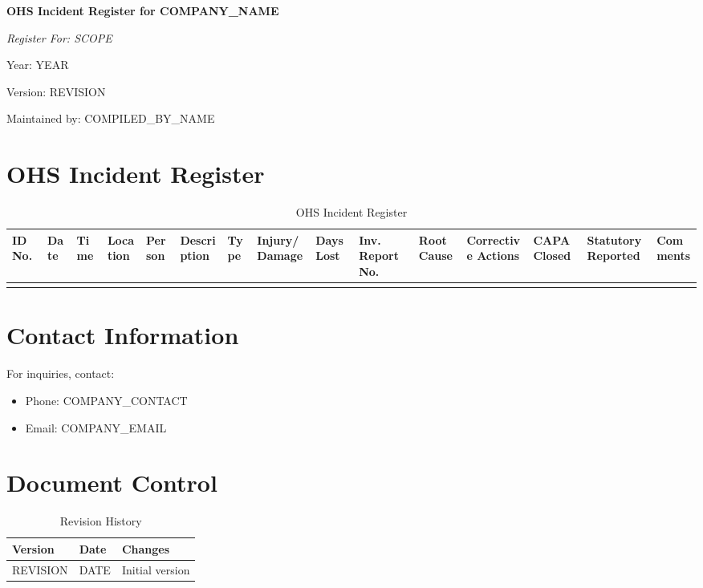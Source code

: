 \documentclass[12pt]{article}
\begin{document}
\begin{titlepage}
    \centering
    \vspace*{2cm}
    {\LARGE\bfseries OHS Incident Register for {{COMPANY_NAME}}\par}
    \vspace{1cm}
    {\large\itshape Register For: {{SCOPE}}\par}
    \vspace{0.5cm}
    {\normalsize Year: {{YEAR}}\par}
    \vspace{0.5cm}
    {\normalsize Version: {{REVISION}}\par}
    \vspace{0.5cm}
    {\normalsize Maintained by: {{COMPILED_BY_NAME}}\par}
\end{titlepage}

\section{OHS Incident Register}

\begin{table}[h]
    \centering
    \begin{tabular}{p{1cm}p{2cm}p{2cm}p{2cm}p{2cm}p{3cm}p{2cm}p{2cm}p{2cm}p{2cm}p{2cm}p{2cm}p{2cm}p{2cm}}
        \toprule
        \textbf{ID No.} & \textbf{Date} & \textbf{Time} & \textbf{Location} & \textbf{Person} & \textbf{Description} & \textbf{Type} & \textbf{Injury/Damage} & \textbf{Days Lost} & \textbf{Inv. Report No.} & \textbf{Root Cause} & \textbf{Corrective Actions} & \textbf{CAPA Closed} & \textbf{Statutory Reported} & \textbf{Comments} \\
        \midrule
        & & & & & & & & & & & & & & \\
        \bottomrule
    \end{tabular}
    \caption{OHS Incident Register}
\end{table}

\section{Contact Information}
For inquiries, contact:
\begin{itemize}
    \item Phone: {{COMPANY_CONTACT}}
    \item Email: {{COMPANY_EMAIL}}
\end{itemize}

\section{Document Control}
\begin{table}[h]
    \centering
    \begin{tabular}{p{3cm}p{3cm}p{6cm}}
        \toprule
        \textbf{Version} & \textbf{Date} & \textbf{Changes} \\
        \midrule
        {{REVISION}} & {{DATE}} & Initial version \\
        \bottomrule
    \end{tabular}
    \caption{Revision History}
\end{table}
\end{document}
